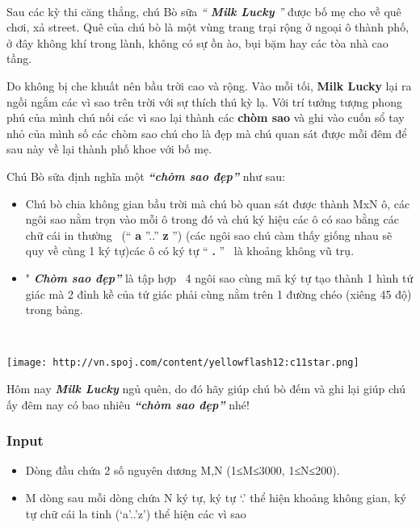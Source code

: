 

 

Sau các kỳ thi căng thẳng, chú Bò sữa \emph{ “ \textbf{ Milk Lucky } ” } được bố mẹ cho về quê chơi, xả street. Quê của chú bò là một vùng trang trại rộng ở ngoại ô thành phố, ở đây không khí trong lành, không có sự ồn ào, bụi bặm hay các tòa nhà cao tầng.

Do không bị che khuất nên bầu trời cao và rộng. Vào mỗi tối, \textbf{ Milk Lucky } lại ra ngồi ngắm các vì sao trên trời với sự thích thú kỳ lạ. Với trí tưởng tượng phong phú của mình chú nối các vì sao lại thành các \textbf{ chòm sao } và ghi vào cuốn sổ tay nhỏ của mình số các chòm sao chú cho là đẹp mà chú quan sát được mỗi đêm để sau này về lại thành phố khoe với bố mẹ.

Chú Bò sữa định nghĩa một \textbf{\emph{ “chòm sao đẹp” }} như sau:
\begin{itemize}
	\item Chú bò chia không gian bầu trời mà chú bò quan sát được thành MxN ô, các ngôi sao nằm trọn vào mỗi ô trong đó và chú ký hiệu các ô có sao bằng các chữ cái in thường  (“ \textbf{ a } ”..” \textbf{ z } ”) (các ngôi sao chú càm thấy giống nhau sẽ quy về cùng 1 ký tự)các ô có ký tự “ \textbf{ . } ”  là khoảng không vũ trụ.
	\item " \textbf{\emph{ Chòm sao đẹp” }} là tập hợp  4 ngôi sao cùng mã ký tự tạo thành 1 hình tứ giác mà 2 đỉnh kề của tứ giác phải cùng nằm trên 1 đường chéo (xiêng 45 độ) trong bảng.
\end{itemize}

 


\texttt{[image: http://vn.spoj.com/content/yellowflash12:c11star.png]}

Hôm nay \textbf{\emph{ Milk Lucky }} ngủ quên, do đó hãy giúp chú bò đếm và ghi lại giúp chú ấy đêm nay có bao nhiêu \textbf{\emph{ “chòm sao đẹp” }} nhé!
\begin{itemize}
\end{itemize}

\subsubsection{Input}
\begin{itemize}
	\item Dòng đầu chứa 2 số nguyên dương M,N (1≤M≤3000, 1≤N≤200).
	\item M dòng sau mỗi dòng chứa N ký tự, ký tự ‘.’ thể hiện khoảng không gian, ký tự chữ cái la tinh (‘a’..’z’) thể hiện các vì sao
\end{itemize}

